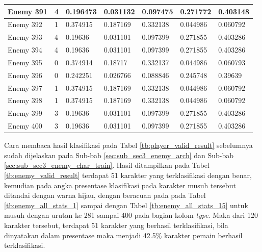 \begin{longtable}{|l|l|l|l|l|l|l|}
	Enemy 391 & 4 & 0.196473 & 0.031132 & 0.097475 & 0.271772 & {\color[HTML]{009901} 0.403148} \\ \hline
	Enemy 392 & 1 & 0.374915 & {\color[HTML]{FE0000} 0.187169} & 0.332138 & 0.044986 & 0.060792 \\ \hline
	Enemy 393 & 4 & 0.19636 & 0.031101 & 0.097399 & 0.271855 & {\color[HTML]{009901} 0.403286} \\ \hline
	Enemy 394 & 4 & 0.19636 & 0.031101 & 0.097399 & 0.271855 & {\color[HTML]{009901} 0.403286} \\ \hline
	Enemy 395 & 0 & {\color[HTML]{009901} 0.374914} & 0.18717 & 0.332137 & 0.044986 & 0.060793 \\ \hline
	Enemy 396 & 0 & {\color[HTML]{FE0000} 0.242251} & 0.026766 & 0.088846 & 0.245748 & 0.39639 \\ \hline
	Enemy 397 & 1 & 0.374915 & {\color[HTML]{FE0000} 0.187169} & 0.332138 & 0.044986 & 0.060792 \\ \hline
	Enemy 398 & 1 & 0.374915 & {\color[HTML]{FE0000} 0.187169} & 0.332138 & 0.044986 & 0.060792 \\ \hline
	Enemy 399 & 3 & 0.19636 & 0.031101 & 0.097399 & {\color[HTML]{FE0000} 0.271855} & 0.403286 \\ \hline
	Enemy 400 & 3 & 0.19636 & 0.031101 & 0.097399 & {\color[HTML]{FE0000} 0.271855} & 0.403286 \\ \hline
\end{longtable}
\vspace{1ex}

Cara membaca hasil klasifikasi pada Tabel \ref{tb:player_valid_result} sebelumnya sudah dijelaskan pada Sub-bab \ref{sec:sub_sec3_enemy_arch} dan Sub-bab \ref{sec:sub_sec3_enemy_char_train}. Hasil ditampilkan pada Tabel \ref{tb:enemy_valid_result} terdapat 51 karakter yang terklasifikasi dengan benar, kemudian pada angka presentase klasifikasi pada karakter musuh tersebut ditandai dengan warna hijau, dengan beracuan pada pada Tabel \ref{tb:enemy_all_stats_1} sampai dengan Tabel \ref{tb:enemy_all_stats_15} untuk musuh dengan urutan ke 281 sampai 400 pada bagian kolom \textit{type}. Maka dari 120 karakter tersebut, terdapat 51 karakter yang berhasil terklasifikasi, bila dinyatakan dalam presentase maka menjadi 42.5\% karakter pemain berhasil terklasifikasi.